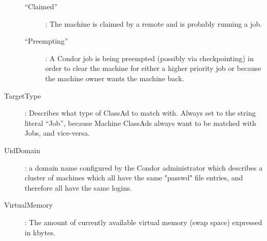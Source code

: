 \begin{description}
\begin{description}
	\item[``Claimed''] : The machine is claimed by a remote
 and is probably running a job.
	\item[``Preempting''] : A Condor job is being preempted (possibly
via checkpointing) in order to clear the machine for either a higher
priority job or because the machine owner wants the machine back.
	\end{description}   %
%
\item[TargetType] : Describes what type of ClassAd to match with.
Always set to the string literal ``Job'', because Machine ClassAds
always want to be matched with Jobs, and vice-versa.
%
\item[UidDomain] : a domain name configured by the Condor 
administrator which describes a cluster of machines which all have 
the same "passwd" file entries, and therefore all have the same logins.
%
\item[VirtualMemory] : The amount of currently available virtual memory 
(swap space) expressed in kbytes.

\end{description}
